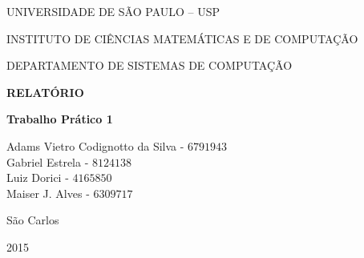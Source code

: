 \documentclass[10pt,a4paper]{article}
\newcommand*\NewPage{\newpage\null\thispagestyle{empty}\newpage}
\begin{document}
\thispagestyle{empty}
\begin{center}
	UNIVERSIDADE DE SÃO PAULO – USP
	
	INSTITUTO DE CIÊNCIAS MATEMÁTICAS E DE COMPUTAÇÃO
	
	DEPARTAMENTO DE SISTEMAS DE COMPUTAÇÃO
	
	\vspace{7cm}
	
	\Large{\textbf{RELATÓRIO}}
	 
	\Large{\textbf{Trabalho Prático 1}}\\
	
	\vspace{6cm}
	
	Adams Vietro Codignotto da Silva - $6791943$ \\ 
	Gabriel Estrela - $8124138$\\
	Luiz Dorici - $4165850$ \\
	Maiser J. Alves	- $6309717$\\
	
	
	\vspace{6cm}
	
	São Carlos
	
	2015
\end{center}

\NewPage
{}

\tableofcontents

\newpage
\end{document}
